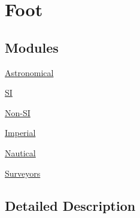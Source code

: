 \hypertarget{group___e_g_x_math-_conversions-_length_conversions-_imperial-_foot}{}\section{Foot}
\label{group___e_g_x_math-_conversions-_length_conversions-_imperial-_foot}
\subsection*{Modules}
\begin{DoxyCompactItemize}
\item 
\mbox{\hyperlink{group___e_g_x_math-_conversions-_length_conversions-_imperial-_foot-_astronomical}{Astronomical}}
\item 
\mbox{\hyperlink{group___e_g_x_math-_conversions-_length_conversions-_imperial-_foot-_s_i}{SI}}
\item 
\mbox{\hyperlink{group___e_g_x_math-_conversions-_length_conversions-_imperial-_foot-_non-_s_i}{Non-\/\+SI}}
\item 
\mbox{\hyperlink{group___e_g_x_math-_conversions-_length_conversions-_imperial-_foot-_imperial}{Imperial}}
\item 
\mbox{\hyperlink{group___e_g_x_math-_conversions-_length_conversions-_imperial-_foot-_nautical}{Nautical}}
\item 
\mbox{\hyperlink{group___e_g_x_math-_conversions-_length_conversions-_imperial-_foot-_surveyors}{Surveyors}}
\end{DoxyCompactItemize}


\subsection{Detailed Description}

